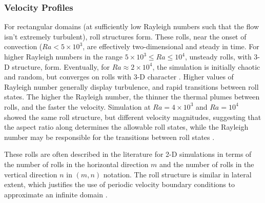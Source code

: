 \documentclass[10pt]{article}
\numberwithin{equation}{section} %
\begin{document}
\subsubsection{Velocity Profiles}
\label{sec:Rolls}
For rectangular domains (at sufficiently low Rayleigh numbers such that the flow isn't extremely turbulent), roll structures form. These rolls, near the onset of convection (\(Ra<5\times10^3\), are effectively two-dimensional and steady in time. For higher Rayleigh numbers in the range \(5\times10^3\leq Ra\leq10^4\), unsteady rolls, with 3-D structure, form. Eventually, for \(Ra\approx2\times10^4\), the simulation is initially chaotic and random, but converges on rolls with 3-D character \cite{sandberg}. Higher values of Rayleigh number generally display turbulence, and rapid transitions between roll states. The higher the Rayleigh number, the thinner the thermal plumes between rolls, and the faster the velocity. Simulation at \(Ra=4\times10^3\) and \(Ra=10^4\) showed the same roll structure, but different velocity magnitudes, suggesting that the aspect ratio along determines the allowable roll states, while the Rayleigh number may be responsible for the transitions between roll states \cite{sandberg}.

These rolls are often described in the literature for 2-D simulations in terms of the number of rolls in the horizontal direction \(m\) and the number of rolls in the vertical direction \(n\) in \((m, n)\) notation. The roll structure is similar in lateral extent, which justifies the use of periodic velocity boundary conditions to approximate an infinite domain \cite{berge}.

\begin{comment}
The lateral velocity \(V_x\) and the axial velocity \(V_z\) essentially behave as a fundamental sinusoidal mode, varying as:

\beq
V_x(x,z)=\tilde{V}_x(z)\sin{(ax+\phi)}
\eeq

\beq
V_z(x,z)=\tilde{V}_z(z)\cos{(ax+\phi)}
\eeq

where \(a\) is the wavenumber,

\beq
a\equiv\frac{2\pi H}{\lambda}
\eeq

\(\lambda\) is the wavelength, or the distance between identical crests in the sinusoid, and \(\phi\) is the phase shift that defines the position of the rolls in the domain. Substituting these assumed forms into the continuity equation shows that the two velocity components are phase shifted from one another by \(\pi/2\) \cite{berge}. 
\end{comment}
\end{document}

